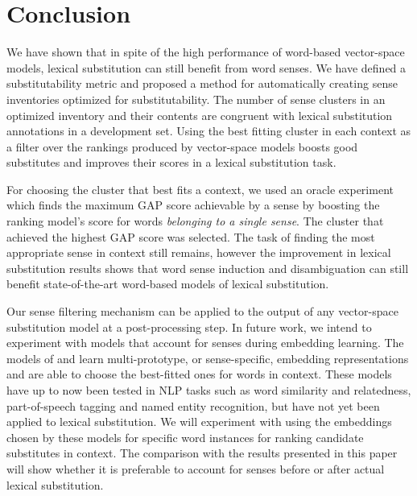 \documentclass[11pt]{article}
\begin{document}
\section{Conclusion}

We have shown that in spite of the high performance of word-based vector-space models, lexical substitution can still benefit from word senses. We have defined a substitutability metric and proposed a method for automatically creating sense inventories optimized for substitutability. The number of sense clusters in an optimized inventory and their contents are congruent with lexical substitution annotations in a development set. Using the best fitting cluster in each context as a filter over the rankings produced by vector-space models boosts good substitutes and improves their scores in a lexical substitution task. 

For choosing the cluster that best fits a context, we used an oracle experiment which finds the maximum GAP score achievable by a sense by boosting the ranking model's score for words \textit{belonging to a single sense}. The cluster that achieved the highest GAP score was selected. The task of finding the most appropriate sense in context still remains, however the improvement in lexical substitution results shows that word sense induction and disambiguation can still benefit state-of-the-art word-based models of lexical substitution. 

Our sense filtering mechanism can be applied to the output of any vector-space substitution model at a post-processing step. In future work, we intend to experiment with models that account for senses during embedding learning. The models of  and  learn multi-prototype, or sense-specific, embedding representations and are able to choose the best-fitted ones for words in context. These models have up to now been tested in NLP tasks such as word similarity and relatedness, part-of-speech tagging and named entity recognition, but have not yet been applied to lexical substitution. We will experiment with using the embeddings chosen by these models for specific word instances for ranking candidate substitutes in context. The comparison with the results presented in this paper will show whether it is preferable to account for senses before or after actual lexical substitution.




\end{document}
